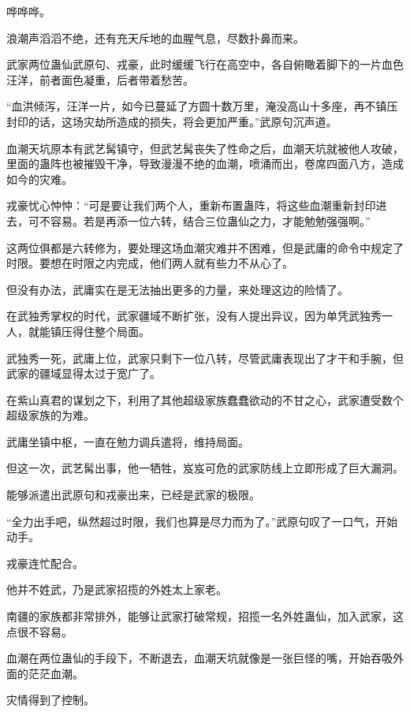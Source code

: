 
\begin{this_body}

哗哗哗。

浪潮声滔滔不绝，还有充天斥地的血腥气息，尽数扑鼻而来。

武家两位蛊仙武原句、戎豪，此时缓缓飞行在高空中，各自俯瞰着脚下的一片血色汪洋，前者面色凝重，后者带着愁苦。

“血洪倾泻，汪洋一片，如今已蔓延了方圆十数万里，淹没高山十多座，再不镇压封印的话，这场灾劫所造成的损失，将会更加严重。”武原句沉声道。

血潮天坑原本有武艺髯镇守，但武艺髯丧失了性命之后，血潮天坑就被他人攻破，里面的蛊阵也被摧毁干净，导致漫漫不绝的血潮，喷涌而出，卷席四面八方，造成如今的灾难。

戎豪忧心忡忡：“可是要让我们两个人，重新布置蛊阵，将这些血潮重新封印进去，可不容易。若是再添一位六转，结合三位蛊仙之力，才能勉勉强强啊。”

这两位俱都是六转修为，要处理这场血潮灾难并不困难，但是武庸的命令中规定了时限。要想在时限之内完成，他们两人就有些力不从心了。

但没有办法，武庸实在是无法抽出更多的力量，来处理这边的险情了。

在武独秀掌权的时代，武家疆域不断扩张，没有人提出异议，因为单凭武独秀一人，就能镇压得住整个局面。

武独秀一死，武庸上位，武家只剩下一位八转，尽管武庸表现出了才干和手腕，但武家的疆域显得太过于宽广了。

在紫山真君的谋划之下，利用了其他超级家族蠢蠢欲动的不甘之心，武家遭受数个超级家族的为难。

武庸坐镇中枢，一直在勉力调兵遣将，维持局面。

但这一次，武艺髯出事，他一牺牲，岌岌可危的武家防线上立即形成了巨大漏洞。

能够派遣出武原句和戎豪出来，已经是武家的极限。

“全力出手吧，纵然超过时限，我们也算是尽力而为了。”武原句叹了一口气，开始动手。

戎豪连忙配合。

他并不姓武，乃是武家招揽的外姓太上家老。

南疆的家族都非常排外，能够让武家打破常规，招揽一名外姓蛊仙，加入武家，这点很不容易。

血潮在两位蛊仙的手段下，不断退去，血潮天坑就像是一张巨怪的嘴，开始吞吸外面的茫茫血潮。

灾情得到了控制。


\end{this_body}
